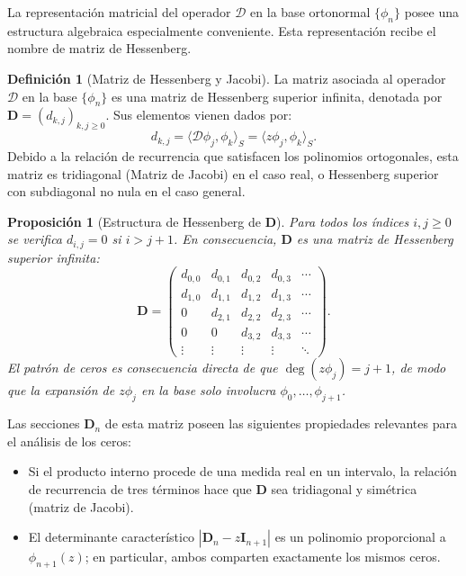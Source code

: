 \documentclass[12pt,a4paper]{article}
\newtheorem{proposition}{Proposición}
\theoremstyle{definition}
\newtheorem{definition}{Definición}
\theoremstyle{remark}
\newcommand{\D}{\mathcal{D}}
\begin{document}
La representación matricial del operador $\D$ en la base ortonormal $\{\phi_n\}$ posee una estructura algebraica especialmente conveniente. Esta representación recibe el nombre de matriz de Hessenberg.

\begin{definition}[Matriz de Hessenberg y Jacobi] \label{def:hessenberg}
  La matriz asociada al operador $\D$ en la base $\{\phi_n\}$ es una matriz de Hessenberg superior infinita, denotada por $\mathbf{D} = (d_{k,j})_{k,j\ge 0}$. Sus elementos vienen dados por:
  \begin{equation}
    d_{k,j} = \langle \D\phi_j, \phi_k \rangle_S = \langle z \phi_j, \phi_k \rangle_S.
  \end{equation}
  Debido a la relación de recurrencia que satisfacen los polinomios ortogonales, esta matriz es tridiagonal (Matriz de Jacobi) en el caso real, o Hessenberg superior con subdiagonal no nula en el caso general.
\end{definition}

\begin{proposition}[Estructura de Hessenberg de $\mathbf{D}$]\label{prop:hessenberg}
  Para todos los índices $i, j \geq 0$ se verifica $d_{i,j} = 0$ si $i > j+1$. En consecuencia, $\mathbf{D}$ es una matriz de Hessenberg superior infinita:
  \[
    \mathbf{D} = \begin{pmatrix}
      d_{0,0} & d_{0,1} & d_{0,2} & d_{0,3} & \cdots \\
      d_{1,0} & d_{1,1} & d_{1,2} & d_{1,3} & \cdots \\
      0       & d_{2,1} & d_{2,2} & d_{2,3} & \cdots \\
      0       & 0       & d_{3,2} & d_{3,3} & \cdots \\
      \vdots  & \vdots  & \vdots  & \vdots  & \ddots
    \end{pmatrix}.
  \]
  El patrón de ceros es consecuencia directa de que $\deg(z\phi_j) = j+1$, de modo que la expansión de $z\phi_j$ en la base solo involucra $\phi_0, \dots, \phi_{j+1}$.
\end{proposition}

Las secciones $\mathbf{D}_n$ de esta matriz poseen las siguientes propiedades relevantes para el análisis de los ceros:

\begin{itemize}
  \item Si el producto interno procede de una medida real en un intervalo, la relación de recurrencia de tres términos hace que $\mathbf{D}$ sea tridiagonal y simétrica (matriz de Jacobi).
  \item El determinante característico $|\mathbf{D}_n - z\mathbf{I}_{n+1}|$ es un polinomio proporcional a $\phi_{n+1}(z)$; en particular, ambos comparten exactamente los mismos ceros.
\end{itemize}
\end{document}
